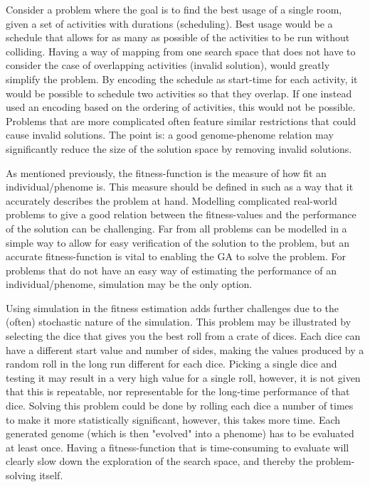 \documentclass[10pt,a4paper]{book}
\begin{document}
Consider a problem where the goal is to find the best usage of a single room, given a set of activities with durations (scheduling). Best usage would be a schedule that allows for as many as possible of the activities to be run without colliding. Having a way of mapping from one search space that does not have to consider the case of overlapping activities (invalid solution), would greatly simplify the problem. By encoding the schedule as start-time for each activity, it would be possible to schedule two activities so that they overlap. If one instead used an encoding based on the ordering of activities, this would not be possible. Problems that are more complicated often feature similar restrictions that could cause invalid solutions. The point is: a good genome-phenome relation may significantly reduce the size of the solution space by removing invalid solutions.

As mentioned previously, the fitness-function is the measure of how fit an individual/phenome is. This measure should be defined in such as a way that it accurately describes the problem at hand. Modelling complicated real-world problems to give a good relation between the fitness-values and the performance of the solution can be challenging. Far from all problems can be modelled in a simple way to allow for easy verification of the solution to the problem, but an accurate fitness-function is vital to enabling the \gls{GA} to solve the problem. For problems that do not have an easy way of estimating the performance of an individual/phenome, simulation may be the only option. 

Using simulation in the fitness estimation adds further challenges due to the (often) stochastic nature of the simulation. This problem may be illustrated by selecting the dice that gives you the best roll from a crate of dices. Each dice can have a different start value and number of sides, making the values produced by a random roll in the long run different for each dice. Picking a single dice and testing it may result in a very high value for a single roll, however, it is not given that this is repeatable, nor representable for the long-time performance of that dice. Solving this problem could be done by rolling each dice a number of times to make it more statistically significant, however, this takes more time. Each generated genome (which is then "evolved" into a phenome) has to be evaluated at least once. Having a fitness-function that is time-consuming to evaluate will clearly slow down the exploration of the search space, and thereby the problem-solving itself.
\end{document}
